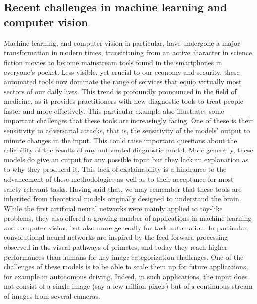 \documentclass[default]{sn-jnl}%
\theoremstyle{thmstyleone}%
\theoremstyle{thmstyletwo}%
\theoremstyle{thmstylethree}%
\begin{document}
\subsection{Recent challenges in machine learning and computer vision}
Machine learning, and computer vision in particular, have undergone a major transformation in modern times, transitioning from an active character in science fiction movies to become mainstream tools found in the smartphones in everyone's pocket. Less visible, yet crucial to our economy and security, these automated tools now dominate the range of services that equip virtually most sectors of our daily lives. This trend is profoundly pronounced in the field of medicine, as it provides practitioners with new diagnostic tools to treat people faster and more effectively. This particular example also illustrates some important challenges that these tools are increasingly facing. One of these is their sensitivity to adversarial attacks, that is, the sensitivity of the models' output to minute changes in the input. This could raise important questions about the reliability of the results of any automated diagnostic model. More generally, these models do give an output for any possible input but they lack an explanation as to why they produced it. This lack of explainability is a hindrance to the advancement of these methodologies as well as to their acceptance for most safety-relevant tasks. Having said that, we may remember that these tools are inherited from theoretical models originally designed to understand the brain. While the first artificial neural networks were mainly applied to toy-like problems, they also offered a growing number of applications in machine learning and computer vision, but also more generally for task automation. In particular, convolutional neural networks are inspired by the feed-forward processing observed in the visual pathways of primates, and today they reach higher performances than humans for key image categorization challenges. One of the challenges of these models is to be able to scale them up for future applications, for example in autonomous driving. Indeed, in such applications, the input does not consist of a single image (say a few million pixels) but of a continuous stream of images from several cameras.
\end{document}
